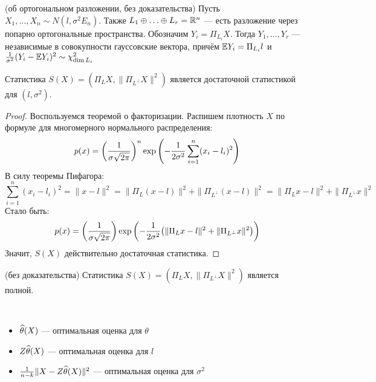 \begin{theorem} (об ортогональном разложении, без доказательства)
	Пусть $X_1, \ldots, X_n \sim N(l, \sigma^2 E_n)$. Также $L_1 \oplus \ldots \oplus L_r = \mathbb{R}^n$ --- есть разложение через попарно ортогональные пространства. Обозначим $Y_i = \Pi_{L_i} X$. Тогда $Y_1, \ldots, Y_r$ --- независимые в совокупности гауссовские вектора, причём $\mathbb{E} Y_i = \Pi_{L_i} l$ и $\frac{1}{\sigma^2}(Y_i - \mathbb{E} Y_i)^2 \sim \chi_{\dim L_i}^2$
\end{theorem}

\begin{proposition}
	Статистика $S(X) = (\Pi_L X, \|\Pi_{L^\bot} X\|^2)$ является достаточной статистикой для $(l, \sigma^2)$.
\end{proposition}

\begin{proof}
	Воспользуемся теоремой о факторизации. Распишем плотность $X$ по формуле для многомерного нормального распределения:
	\[
		p(x) = \left(\frac{1}{\sigma\sqrt{2\pi}}\right)^n\exp\left(-\frac{1}{2\sigma^2}\sum_{i = 1}^n (x_i - l_i)^2\right)
	\]
	В силу теоремы Пифагора:
	\[
		\sum_{i = 1}^n (x_i - l_i)^2 = \|x - l\|^2 = \|\Pi_L (x - l)\|^2 + \|\Pi_{L^\bot} (x - l)\|^2 = \|\Pi_L x - l\|^2 + \|\Pi_{L^\bot} x\|^2
 	\]
 	Стало быть:
	\[
	 	p(x) = \left(\frac{1}{\sigma\sqrt{2\pi}}\right)\exp\left(-\frac{1}{2\sigma^2}\big(\|\Pi_L x - l\|^2 + \|\Pi_{L^\bot} x\|^2\big)\right)
	\]
	Значит, $S(X)$ действительно достаточная статистика.
\end{proof}

\begin{theorem} (без доказательства)
	Статистика $S(X) = (\Pi_L X, \|\Pi_{L^\bot} X\|^2)$ является полной.
\end{theorem}

\begin{corollary}~
	\begin{itemize}
		\item $\widehat{\theta}(X)$ --- оптимальная оценка для $\theta$
		
		\item $Z\widehat{\theta}(X)$ --- оптимальная оценка для $l$
		
		\item $\frac{1}{n - k}\|X - Z\widehat{\theta}(X)\|^2$ --- оптимальная оценка для $\sigma^2$
	\end{itemize}
\end{corollary}


